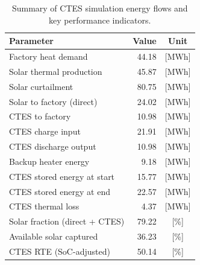 \renewcommand{\arraystretch}{1.2}
\begin{table}[h]
\centering
\begin{tabular}{l|r c}
\hline
Parameter & Value & Unit \\
\hline
Factory heat demand & 44.18 & [MWh] \\
Solar thermal production & 45.87 & [MWh] \\
Solar curtailment & 80.75 & [MWh] \\
Solar to factory (direct) & 24.02 & [MWh] \\
CTES to factory & 10.98 & [MWh] \\
CTES charge input & 21.91 & [MWh] \\
CTES discharge output & 10.98 & [MWh] \\
Backup heater energy & 9.18 & [MWh] \\
CTES stored energy at start & 15.77 & [MWh] \\
CTES stored energy at end & 22.57 & [MWh] \\
CTES thermal loss & 4.37 & [MWh] \\
\hline
Solar fraction (direct + CTES) & 79.22 & [\%] \\
Available solar captured & 36.23 & [\%] \\
CTES RTE (SoC-adjusted) & 50.14 & [\%] \\
\hline
\end{tabular}
\caption{Summary of CTES simulation energy flows and key performance indicators.}
\label{tab:ctes-simulation-summary}
\end{table}
